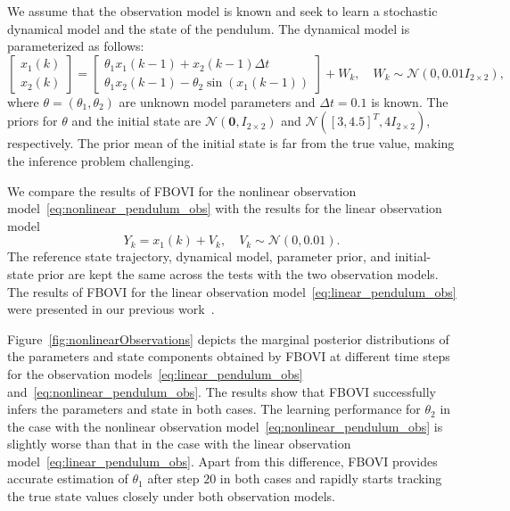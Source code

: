 \documentclass[preprint,3p,times]{elsarticle}
\begin{document}
We assume that the observation model is known and seek to learn a stochastic dynamical model and the state of the pendulum. The dynamical model is parameterized as follows:
\begin{equation*}
\begin{bmatrix}
x_1(k) \\ x_2(k) 
\end{bmatrix}
=
\begin{bmatrix}
\theta_1 x_1(k-1)+x_2(k-1)\Delta t \\
\theta_1 x_2(k-1)-\theta_2\sin(x_1(k-1))
\end{bmatrix}
+
W_k, 
\quad
W_k \sim \mathcal{N}(0,0.01I_{2\times 2}),
\end{equation*}
where $\theta=(\theta_1,\theta_2)$ are unknown model parameters and $\Delta t=0.1$ is known. The priors for $\theta$ and the initial state are $\mathcal{N}(\mathbf{0},I_{2\times 2})$ and $\mathcal{N}([3,4.5]^T,4I_{2\times 2})$, respectively. The prior mean of the initial state is far from the true value, making the inference problem challenging.

We compare the results of FBOVI for the nonlinear observation model~\eqref{eq:nonlinear_pendulum_obs} with the results for the linear observation model
\begin{equation}
Y_k = x_1(k) + V_k, \quad V_k \sim \mathcal{N}(0,0.01).
\label{eq:linear_pendulum_obs}
\end{equation}
The reference state trajectory, dynamical model, parameter prior, and initial-state prior are kept the same across the tests with the two observation models. The results of FBOVI for the linear observation model~\eqref{eq:linear_pendulum_obs} were presented in our previous work~\cite{fbovi}.

Figure~\ref{fig:nonlinearObservations} depicts the marginal posterior distributions of the parameters and state components obtained by FBOVI at different time steps for the observation models~\eqref{eq:linear_pendulum_obs} and~\eqref{eq:nonlinear_pendulum_obs}. The results show that FBOVI successfully infers the parameters and state in both cases. The learning performance for $\theta_2$ in the case with the nonlinear observation model~\eqref{eq:nonlinear_pendulum_obs} is slightly worse than that in the case with the linear observation model~\eqref{eq:linear_pendulum_obs}. Apart from this difference, FBOVI provides accurate estimation of $\theta_1$ after step $20$ in both cases and rapidly starts tracking the true state values closely under both observation models.
\end{document}

